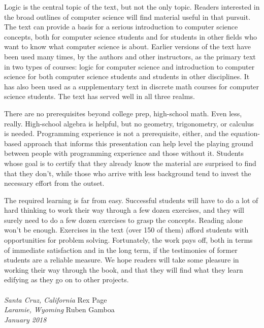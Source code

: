 Logic is the central topic of the text, but not the only topic.
Readers interested in the broad outlines of computer science
will find material useful in that pursuit.
The text can provide a basis for a serious introduction
to computer science concepts, both for computer science students
and for students in other fields who want to know
what computer science is about.
Earlier versions of the text have been used many times,
by the authors and other instructors,
as the primary text in two types of courses: logic for computer science
and introduction to computer science for both computer science students
and students in other disciplines. 
It has also been used as a supplementary
text in discrete math courses for computer science students.
The text has served well in all three realms.

There are no prerequisites beyond college prep, high-school math.
Even less, really.
High-school algebra is helpful,
but no geometry, trigonometry, or calculus is needed.
Programming experience is not a prerequisite, either, and
the equation-based approach that informs this presentation can
help level the playing ground between people
with programming experience and those without it.
Students whose goal is to certify that they already
know the material are surprised to find that they don't,
while those who arrive with less background tend
to invest the necessary effort from the outset.

The required learning is far from easy.
Successful students will have to do a lot of hard thinking
to work their way through a few dozen exercises,
and they will surely need to do a few dozen exercises to grasp the concepts.
Reading alone won't be enough.
Exercises in the text (over 150 of them) afford students with opportunities
for problem solving.
Fortunately, the work pays off, both in terms of immediate satisfaction
and in the long term, if the testimonies of former students are a
reliable measure.
We hope readers will take some pleasure in working their way through
the book, and that they will find what they learn
edifying as they go on to other projects.
\\
\\
\emph{Santa Cruz, California}   \hfill Rex Page     \\
\emph{Laramie, Wyoming}         \hfill Ruben Gamboa \\
\emph{January 2018}

